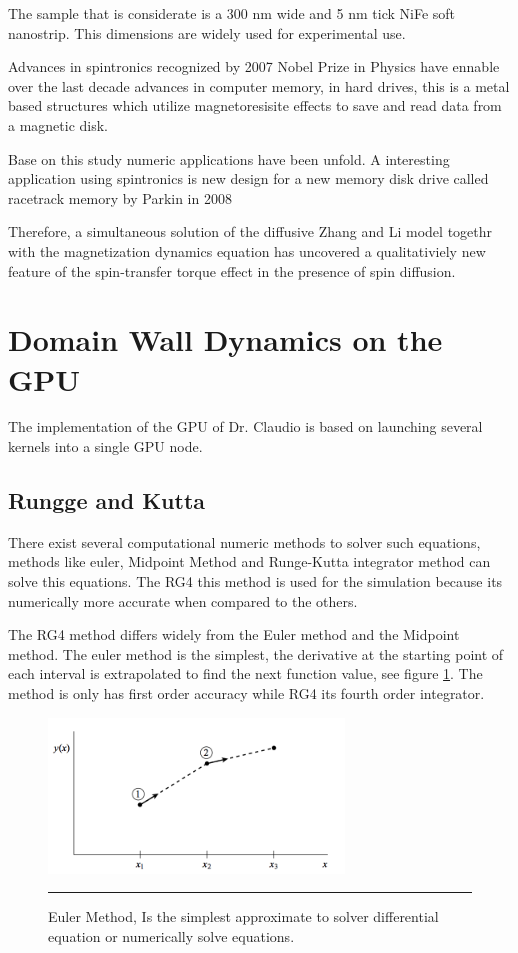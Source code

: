 The sample that is considerate is a 300 nm wide and 5 nm tick NiFe soft nanostrip. This dimensions are widely used for experimental use.


Advances in spintronics recognized by 2007 Nobel Prize in Physics have ennable over the last decade advances in computer memory, in hard drives, this is a metal based structures which utilize magnetoresisite effects to save and read data from a magnetic disk. \cite{handbookspin} 


Base on this study numeric applications have been unfold. A interesting application using spintronics is new design for a new memory disk drive called racetrack memory by  Parkin in 2008\cite{racetrack}


Therefore, a simultaneous solution of the diffusive Zhang and Li model togethr with the magnetization dynamics equation has uncovered a qualitativiely new feature of the spin-transfer torque effect in the presence of spin diffusion.


\section{Domain Wall Dynamics on the GPU}


The implementation of the GPU of Dr. Claudio is based on launching several kernels into a single GPU node.


\subsection{Rungge and Kutta}

There exist several computational numeric methods to solver such equations, methods like euler, Midpoint Method and Runge-Kutta integrator method can solve this equations. The RG4 this method is used for the simulation because its numerically more accurate when compared to the others.

The RG4 method differs widely from the Euler method and the Midpoint method. The euler method is the simplest, the derivative at the starting point of each interval is extrapolated to find the next function value, see figure \ref{fig:euler}. The method is only has first order accuracy while RG4 its fourth order integrator.

\begin{figure}[htbp]
	\centering
		\includegraphics[width=0.7\textwidth]{Figures/euler.png}
		\rule{35em}{0.5pt}
	\caption[Euler Method]{Euler Method, Is the simplest approximate to solver differential equation or numerically solve equations.}
	\label{fig:euler}
\end{figure}


